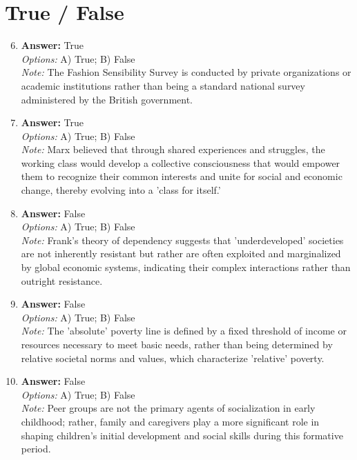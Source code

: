 \documentclass[12pt]{article}
\begin{document}
\section*{True / False}
\begin{enumerate}[label=\arabic*.]
\setcounter{enumi}{5}
\item \textbf{Answer:} True
\\ \textit{Options:} A) True; B) False
\\ \textit{Note:} The Fashion Sensibility Survey is conducted by private organizations or academic institutions rather than being a standard national survey administered by the British government.
\item \textbf{Answer:} True
\\ \textit{Options:} A) True; B) False
\\ \textit{Note:} Marx believed that through shared experiences and struggles, the working class would develop a collective consciousness that would empower them to recognize their common interests and unite for social and economic change, thereby evolving into a 'class for itself.'
\item \textbf{Answer:} False
\\ \textit{Options:} A) True; B) False
\\ \textit{Note:} Frank's theory of dependency suggests that 'underdeveloped' societies are not inherently resistant but rather are often exploited and marginalized by global economic systems, indicating their complex interactions rather than outright resistance.
\item \textbf{Answer:} False
\\ \textit{Options:} A) True; B) False
\\ \textit{Note:} The 'absolute' poverty line is defined by a fixed threshold of income or resources necessary to meet basic needs, rather than being determined by relative societal norms and values, which characterize 'relative' poverty.
\item \textbf{Answer:} False
\\ \textit{Options:} A) True; B) False
\\ \textit{Note:} Peer groups are not the primary agents of socialization in early childhood; rather, family and caregivers play a more significant role in shaping children's initial development and social skills during this formative period.
\end{enumerate}
\end{document}
